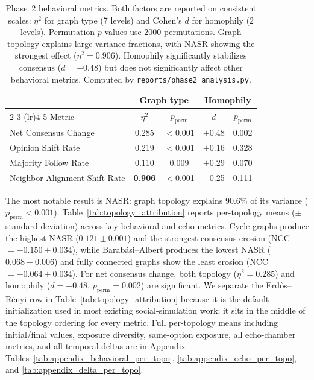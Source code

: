 \documentclass[11pt]{article}
\begin{document}
\begin{table}[t]
\centering
\begin{tabular}{l cc cc}
\toprule
& \multicolumn{2}{c}{Graph type} & \multicolumn{2}{c}{Homophily} \\
\cmidrule(lr){2-3} \cmidrule(lr){4-5}
Metric & $\eta^2$ & $p_{\text{perm}}$ & $d$ & $p_{\text{perm}}$ \\
\midrule
Net Consensus Change            & 0.285             & $<$0.001 & $+$0.48        & 0.002 \\
Opinion Shift Rate              & 0.219             & $<$0.001 & $+$0.16        & 0.328 \\
Majority Follow Rate            & 0.110             & 0.009    & $+$0.29        & 0.070 \\
Neighbor Alignment Shift Rate   & \textbf{0.906}    & $<$0.001 & $-$0.25        & 0.111 \\
\bottomrule
\end{tabular}
\caption{Phase~2 behavioral metrics. Both factors are reported on consistent scales: $\eta^2$ for graph type (7 levels) and Cohen's $d$ for homophily (2 levels). Permutation $p$-values use 2000 permutations. Graph topology explains large variance fractions, with NASR showing the strongest effect ($\eta^2 = 0.906$). Homophily significantly stabilizes consensus ($d = +0.48$) but does not significantly affect other behavioral metrics. Computed by \texttt{reports/phase2\_analysis.py}.}
\label{tab:phase2_behavioral}
\end{table}

The most notable result is NASR: graph topology explains 90.6\% of its variance ($p_{\text{perm}} < 0.001$). Table~\ref{tab:topology_attribution} reports per-topology means ($\pm$ standard deviation) across key behavioral and echo metrics. Cycle graphs produce the highest NASR ($0.121 \pm 0.001$) and the strongest consensus erosion (NCC $= -0.150 \pm 0.034$), while Barab\'{a}si--Albert produces the lowest NASR ($0.068 \pm 0.006$) and fully connected graphs show the least erosion (NCC $= -0.064 \pm 0.034$). For net consensus change, both topology ($\eta^2 = 0.285$) and homophily ($d = +0.48$, $p_{\text{perm}} = 0.002$) are significant. We separate the Erd\H{o}s--R\'enyi row in Table~\ref{tab:topology_attribution} because it is the default initialization used in most existing social-simulation work; it sits in the middle of the topology ordering for every metric. Full per-topology means including initial/final values, exposure diversity, same-option exposure, all echo-chamber metrics, and all temporal deltas are in Appendix Tables~\ref{tab:appendix_behavioral_per_topo}, \ref{tab:appendix_echo_per_topo}, and \ref{tab:appendix_delta_per_topo}.
\end{document}
